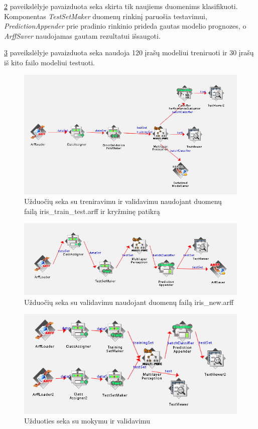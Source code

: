 \documentclass{VUMIFPSbakalaurinis}
\begin{document}
\ref{img:2-seka} paveikslėlyje pavaizduota seka
skirta tik naujiems duomenims klasifikuoti.
Komponentas \textit{TestSetMaker} duomenų rinkinį paruošia
testavimui, \textit{PredictionAppender} prie pradinio rinkinio
prideda gautas modelio prognozes, o \textit{ArffSaver}
naudojamas gautam rezultatui išsaugoti.


\ref{img:3-seka} paveikslėlyje pavaizduota seka naudoja
120 įrašų modeliui treniruoti ir 30 įrašų iš kito failo 
modeliui testuoti.



\begin{figure}[H]
  \centering
  \includegraphics[scale=0.5]{img/1-seka.png}
  \caption{Užduočių seka su treniravimu ir validavimu naudojant 
  duomenų failą iris\_train\_test.arff ir kryžminę patikrą}
  \label{img:1-seka}
\end{figure}

\begin{figure}[H]
  \centering
  \includegraphics[scale=0.5]{img/2-seka.png}
  \caption{Užduočių seka su validavimu naudojant 
  duomenų failą iris\_new.arff}
  \label{img:2-seka}
\end{figure}

\begin{figure}[H]
  \centering
  \includegraphics[scale=0.5]{img/3-seka.png}
  \caption{Užduoties seka su mokymu ir validavimu}
  \label{img:3-seka}
\end{figure}
\end{document}
